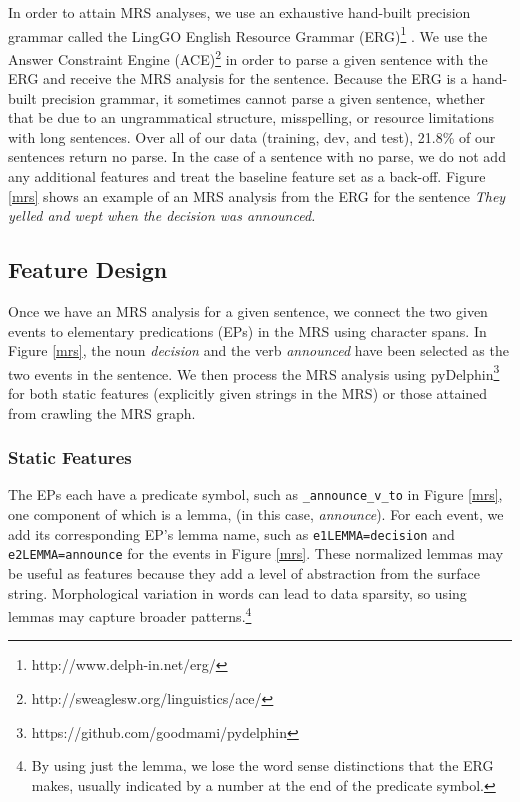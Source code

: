 \documentclass[11pt]{article}
\begin{document}
In order to attain MRS analyses, we use an exhaustive hand-built precision grammar called the LingGO English Resource Grammar (ERG)\footnote{http://www.delph-in.net/erg/} \cite{Flickinger:00}. We use the Answer Constraint Engine (ACE)\footnote{http://sweaglesw.org/linguistics/ace/} in order to parse a given sentence with the ERG and receive the MRS analysis for the sentence. Because the ERG is a hand-built precision grammar, it sometimes cannot parse a given sentence, whether that be due to an ungrammatical structure, misspelling, or resource limitations with long sentences. Over all of our data (training, dev, and test), 21.8\% of our sentences return no parse. In the case of a sentence with no parse, we do not add any additional features and treat the baseline feature set as a back-off. Figure \ref{mrs} shows an example of an MRS analysis from the ERG for the sentence \emph{They yelled and wept when the decision was announced.}

\subsection{Feature Design}

Once we have an MRS analysis for a given sentence, we connect the two given events to elementary predications (EPs) in the MRS using character spans. In Figure \ref{mrs}, the noun \emph{decision} and the verb \emph{announced} have been selected as the two events in the sentence. We then process the MRS analysis using pyDelphin\footnote{https://github.com/goodmami/pydelphin} for both static features (explicitly given strings in the MRS) or those attained from crawling the MRS graph.




\subsubsection{Static Features}

The EPs each have a predicate symbol, such as \texttt{\_announce\_v\_to} in Figure \ref{mrs}, one component of which is a lemma, (in this case, \textit{announce}). For each event, we add its corresponding EP's lemma name, such as \texttt{e1LEMMA=decision} and \texttt{e2LEMMA=announce} for the events in Figure \ref{mrs}. These normalized lemmas may be useful as features because they add a level of abstraction from the surface string. Morphological variation in words can lead to data sparsity, so using lemmas may capture broader patterns.\footnote{By using just the lemma, we lose the word sense distinctions that the ERG makes, usually indicated by a number at the end of the predicate symbol.}
\end{document}
